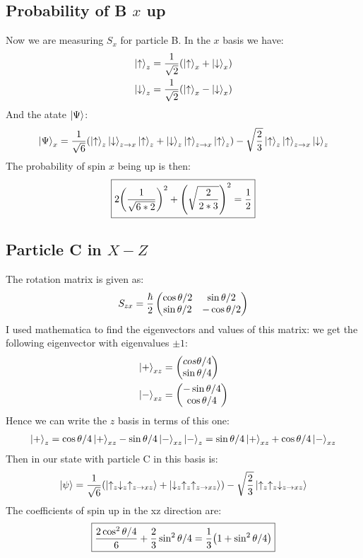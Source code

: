 \documentclass[12pt]{article}
\newcommand{\ua}{\uparrow}
\newcommand{\da}{\downarrow}
\begin{document}
\subsection{Probability of B $x$ up}
Now we are measuring $S_x$ for particle B. In the $x$ basis we have:
\begin{align*}
  \ket{\ua}_z&=\frac1{\sqrt{2}}\qty(\ket{\ua}_x+\ket{\da}_x)\\
  \ket{\da}_z&=\frac1{\sqrt{2}}\qty(\ket{\ua}_x-\ket{\da}_x)
\end{align*}
And the atate $\ket{\Psi}$:
\begin{align*}
  \ket{\Psi}_x=\frac1{\sqrt{6}}
  \qty(\ket{\ua}_z\ket{\da}_{z\to x}\ket{\ua}_z
  +\ket{\da}_z\ket{\ua}_{z\to x}\ket{\ua}_{z})-
  \sqrt{\frac23}\ket{\ua}_z\ket{\ua}_{z\to x}\ket{\da}_z
\end{align*}
The probability of spin $x$ being up is then:
\begin{align*}
  \boxed{2\qty(\frac1{\sqrt{6*2}})^2+\qty(\sqrt{\frac{2}{2*3}})^2=\frac12}
\end{align*}

\subsection{Particle C in $X-Z$}
The rotation matrix is given as:
\begin{align*}
  S_{zx}=\frac\hbar2
  \pmqty{\cos\theta/2&\sin\theta/2\\\sin\theta/2&-\cos\theta/2}
\end{align*}
I used mathematica to find the eigenvectors and values of this matrix: we get the following eigenvector with eigenvalues $\pm1$:
\begin{align*}
  \ket{+}_{xz}&=\pmqty{cos\theta/4\\\sin\theta/4}\\
  \ket{-}_{xz}&=\pmqty{-\sin\theta/4\\\cos\theta/4}
\end{align*}
Hence we can write the $z$ basis in terms of this one:
\begin{align*}
  \ket{+}_z=\cos\theta/4\ket{+}_{xz}-\sin\theta/4\ket{-}_{xz}
  \ket{-}_z=\sin\theta/4\ket{+}_{xz}+\cos\theta/4\ket{-}_{xz}
\end{align*}
Then in our state with particle C in this basis is:
\begin{align*}
  \ket{\psi}=\frac1{\sqrt{6}}\qty(\ket{\ua_z\da_z\ua_{z\to xz}}+
  \ket{\da_z\ua_z\ua_{z\to xz}})-\sqrt{\frac23}\ket{\ua_z\ua_z\da_{z\to xz}}
\end{align*}
The coefficients of spin up in the xz direction are:
\begin{align*}
  \boxed{\frac{2\cos^2\theta/4}{6}+\frac23\sin^2\theta/4
    =\frac13\qty(1+\sin^2\theta/4)}
\end{align*}
\end{document}
